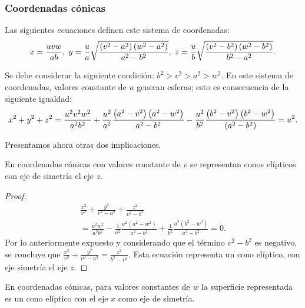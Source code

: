 \subsubsection{Coordenadas cónicas} 

Las siguientes ecuaciones definen este sistema de coordenadas:
\begin{equation*}
x = \frac{uvw}{ab},\hskip0.1cm y = \frac{u}{a}\sqrt{\frac{\left( v^2-a^2\right) \left(
w^2-a^2\right) }{a^2-b^2}}, \hskip0.1cm z=\frac{u}{b}\sqrt{\frac{\left( v^2-b^2\right)
\left(w^2-b^2\right) }{b^2-a^2}}.
\end{equation*}

Se debe considerar la siguiente condición: $b^2>v^2>a^2>w^2$.
En este sistema de coordenadas, valores constante de $u$ generan esferas;
esto es consecuencia de la siguiente igualdad:
\begin{gather*}
x^2+y^2+z^2 = \frac{u^2v^2w^2}{a^2b^2}+\frac{u^2}{a^2}\frac{%
\left( a^2-v^2\right) \left( a^2-w^2\right) }{a^2-b^2}%
- \frac{u^2}{b^2}\frac{\left( b^2-v^2\right) \left(
b^2-w^2\right) }{\left( a^2-b^2\right) }= u^2.
\end{gather*}

Presentamos ahora otras dos implicaciones.

\begin{prop}
En coordenadas cónicas con valores constante de $v$ se representan conos elípticos
con eje de simetría el eje $z$.
\end{prop}

\begin{proof}
\begin{multline*}
\frac{x^2}{v^2}+\frac{y^2}{v^2-a^2}+\frac{z^2}{v^2-b^2} \\
= \frac{u^2w^2}{a^2b^2}-\frac{1}{a^2}\frac{u^2\left( a^2-w^2\right) }{a^2-b^2}+\frac{1}{b^2}\frac{u^2\left( b^2-w^2\right) }{a^2-b^2} =0.
\end{multline*}
Por lo anteriormente expuesto y considerando que el término $ v^2-b^2$ es negativo,
se concluye que  $\frac{x^2}{v^2}+\frac{y^2}{v^2-a^2}=\frac{z^2}{b^2-v^2}$.
Esta ecuación representa un cono elíptico, con eje simetría el eje $z$.
\end{proof}

\begin{prop}
En coordenadas cónicas, para valores constantes de $w$ la superficie
representada es un cono elíptico con el eje $x$
como eje de simetría.
\end{prop}

